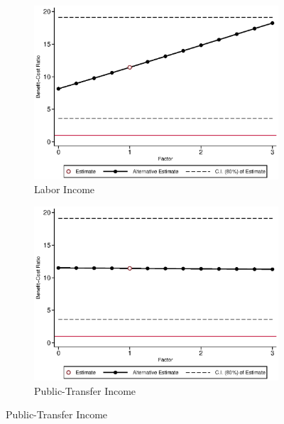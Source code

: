 \begin{figure}[H]
\caption{Benefit/cost Ratio vs.~Components, Males} \label{fig:bcrf_factor_m}
	
	\begin{subfigure}[h]{0.8\textwidth}
	\centering
	\caption{Labor Income} \label{fig:bcrf_inc_labor_m1}
	\includegraphics[width=\textwidth]{AppOutput/Sensitivity/bcrf_inc_labor_m1.eps}
	\end{subfigure}
	
	\begin{subfigure}[h]{0.8\textwidth}
	\centering
	\caption{Public-Transfer Income} \label{fig:bcrf_transfer_m1}
	\includegraphics[width=\textwidth]{AppOutput/Sensitivity/bcrf_transfer_m1.eps}
	\end{subfigure}
\end{figure}

